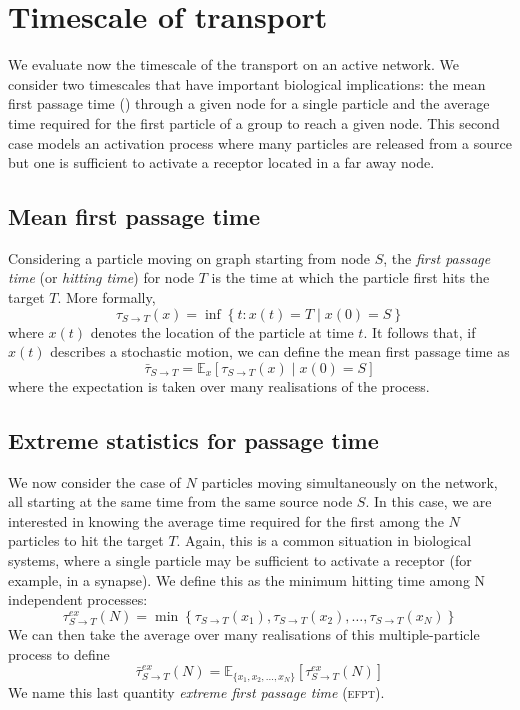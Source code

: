 \section{Timescale of transport}

We evaluate now the timescale of the transport on an active network. We consider two timescales that have important biological implications: the mean first passage time () through a given node for a single particle and the average time required for the first particle of a group to reach a given node. This second case models an activation process where many particles are released from a source but one is sufficient to activate a receptor located in a far away node.

\subsection{Mean first passage time}

Considering a particle moving on graph starting from node $S$, the \emph{first passage time} (or \emph{hitting time}) for node $T$ is the time at which the particle first hits the target $T$. More formally,
\begin{equation}
  \tau_{S \to T}(x) = \inf \left\{ t: x(t) = T \mid x(0) = S \right\}
\end{equation}
where $x(t)$ denotes the location of the particle at time $t$.
It follows that, if $x(t)$ describes a stochastic motion, we can define the mean first passage time as
\begin{equation}
  \bar{\tau}_{S \to T} = \mathbb{E}_x\left[\tau_{S \to T}(x) \mid x(0) = S\right]
\end{equation}
where the expectation is taken over many realisations of the process.


\subsection{Extreme statistics for passage time}

We now consider the case of $N$ particles moving simultaneously on the network, all starting at the same time from the same source node $S$. In this case, we are interested in knowing the average time required for the first among the $N$ particles to hit the target $T$. Again, this is a common situation in biological systems, where a single particle may be sufficient to activate a receptor (for example, in a synapse). We define this as the minimum hitting time among N independent processes:
\begin{equation}
  \tau^{ex}_{S \to T}(N) = \min \left\{ \tau_{S \to T}(x_1), \tau_{S \to T}(x_2), \dots, \tau_{S \to T}(x_N) \right\}
\end{equation}
We can then take the average over many realisations of this multiple-particle process to define
\begin{equation}
  \bar{\tau}^{ex}_{S \to T}(N) = \mathbb{E}_{\{x_1, x_2, \dots, x_N\}} \left[ \tau^{ex}_{S \to T}(N) \right]
\end{equation}
We name this last quantity \textit{extreme first passage time} (\textsc{efpt}).

